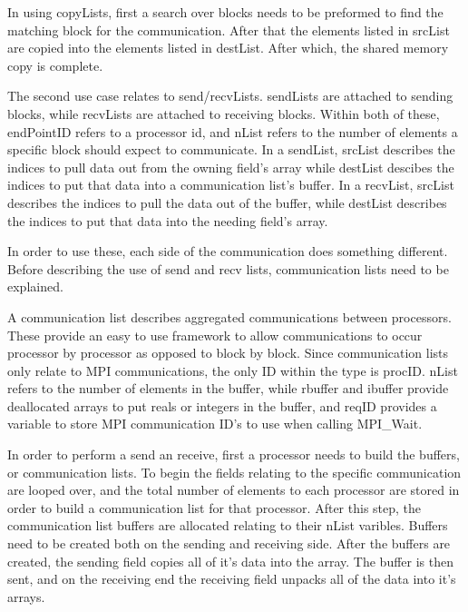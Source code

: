 \documentclass[11pt]{report}
\begin{document}
In using copyLists, first a search over blocks needs to be preformed
to find the matching block for the communication. After that the elements
listed in srcList are copied into the elements listed in destList. After which,
the shared memory copy is complete.

The second use case relates to send/recvLists. sendLists are attached to
sending blocks, while recvLists are attached to receiving blocks. Within both
of these, endPointID refers to a processor id, and nList refers to the number
of elements a specific block should expect to communicate. In a sendList,
srcList describes the indices to pull data out from the owning field's array
while destList descibes the indices to put that data into a communication
list's buffer. In a recvList, srcList describes the indices to pull the data
out of the buffer, while destList describes the indices to put that data into
the needing field's array.

In order to use these, each side of the communication does something different.
Before describing the use of send and recv lists, communication lists need to
be explained.

A communication list describes aggregated communications between processors.
These provide an easy to use framework to allow communications to occur
processor by processor as opposed to block by block. Since communication lists
only relate to MPI communications, the only ID within the type is procID. nList
refers to the number of elements in the buffer, while rbuffer and ibuffer
provide deallocated arrays to put reals or integers in the buffer, and reqID
provides a variable to store MPI communication ID's to use when calling
MPI\_Wait.

In order to perform a send an receive, first a processor needs to build the
buffers, or communication lists. To begin the fields relating to the specific
communication are looped over, and the total number of elements to each
processor are stored in order to build a communication list for that processor.
After this step, the communication list buffers are allocated relating to their
nList varibles. Buffers need to be created both on the sending and receiving
side. After the buffers are created, the sending field copies all of it's data
into the array. The buffer is then sent, and on the receiving end the receiving
field unpacks all of the data into it's arrays.
\end{document}
